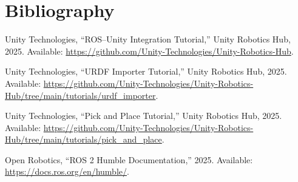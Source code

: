 \documentclass[12pt]{article}
\begin{document}
\section*{Bibliography}
\begin{thebibliography}{9}
Unity Technologies, ``ROS--Unity Integration Tutorial,'' Unity Robotics Hub, 2025. Available: \url{https://github.com/Unity-Technologies/Unity-Robotics-Hub}.

Unity Technologies, ``URDF Importer Tutorial,'' Unity Robotics Hub, 2025. Available: \url{https://github.com/Unity-Technologies/Unity-Robotics-Hub/tree/main/tutorials/urdf_importer}.

Unity Technologies, ``Pick and Place Tutorial,'' Unity Robotics Hub, 2025. Available: \url{https://github.com/Unity-Technologies/Unity-Robotics-Hub/tree/main/tutorials/pick_and_place}.

Open Robotics, ``ROS 2 Humble Documentation,'' 2025. Available: \url{https://docs.ros.org/en/humble/}.
\end{thebibliography}
\end{document}
